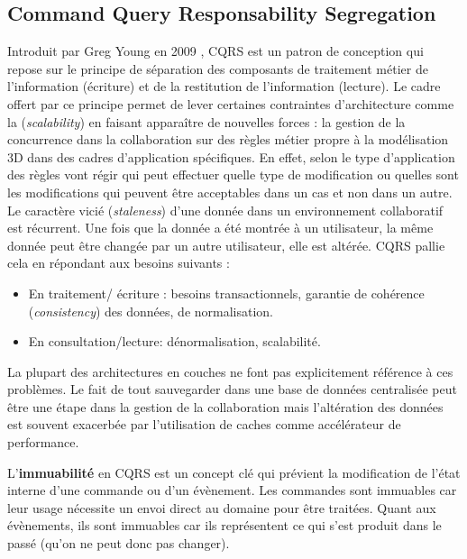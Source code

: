 \subsection{Command Query Responsability Segregation}
\label{sec:CQRS}
Introduit par Greg Young en 2009 \cite{Young2009}, \gls{CQRS} est un patron de 
conception qui repose sur le principe de séparation des composants de traitement 
métier de l'information (écriture) et de la restitution de l'information (lecture). Le 
cadre offert par ce principe permet de lever certaines contraintes d'architecture 
comme la (\textit{scalability}) en faisant apparaître de nouvelles forces : la gestion 
de la concurrence dans la collaboration sur des règles métier propre à la 
modélisation 3D dans des cadres d'application spécifiques. En effet, selon le type 
d'application des règles vont régir qui peut effectuer quelle type de modification ou 
quelles sont les modifications qui peuvent être acceptables dans un cas et non 
dans un autre.
Le caractère vicié (\textit{staleness}) d'une donnée dans un environnement 
collaboratif est récurrent. Une fois que la donnée a été montrée à un utilisateur, la 
même donnée peut être changée par un autre utilisateur, elle est altérée. 
\gls{CQRS} pallie cela en répondant aux besoins suivants :
\begin{itemize}
	\item En traitement/ écriture : besoins transactionnels, garantie de cohérence 
	(\textit{consistency}) des données, de normalisation.
	\item En consultation/lecture: dénormalisation, scalabilité. 
\end{itemize}

La plupart des architectures en couches ne font pas explicitement référence à ces 
problèmes. Le fait de tout sauvegarder dans une base de données centralisée peut 
être une étape dans la gestion de la collaboration mais l'altération des données est 
souvent exacerbée par l'utilisation de caches comme accélérateur de performance.

L'\textbf{immuabili\-té} en \gls{CQRS} est un concept clé qui prévient la  
modification de l'état interne d'une commande ou d'un évènement. Les 
commandes sont immuables car leur usage nécessite un envoi direct au domaine 
pour être traitées. Quant aux évènements, ils sont immuables car ils représentent 
ce qui s'est produit dans le passé (qu'on ne peut donc pas changer). 

